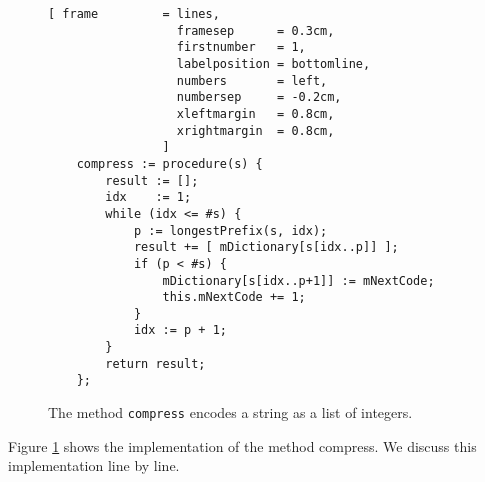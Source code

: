 \begin{figure}[!ht]
\centering
\begin{Verbatim}[ frame         = lines, 
                  framesep      = 0.3cm, 
                  firstnumber   = 1,
                  labelposition = bottomline,
                  numbers       = left,
                  numbersep     = -0.2cm,
                  xleftmargin   = 0.8cm,
                  xrightmargin  = 0.8cm,
                ]
    compress := procedure(s) {
        result := [];
        idx    := 1;
        while (idx <= #s) {
            p := longestPrefix(s, idx);
            result += [ mDictionary[s[idx..p]] ];
            if (p < #s) {
                mDictionary[s[idx..p+1]] := mNextCode;
                this.mNextCode += 1;
            }
            idx := p + 1;
        }
        return result;
    };
\end{Verbatim}
\vspace*{-0.3cm}
\caption{The method \texttt{compress} encodes a string as a list of integers.}
\label{fig:lzw.stlx-compress}
\end{figure}
Figure \ref{fig:lzw.stlx-compress} shows the implementation of the method compress.  We discuss this
implementation line by line.
